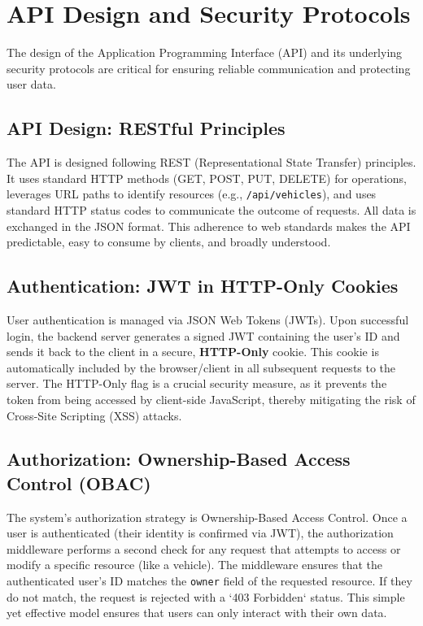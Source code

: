 \section{API Design and Security Protocols}

The design of the Application Programming Interface (API) and its underlying security protocols are critical for ensuring reliable communication and protecting user data.

\subsection{API Design: RESTful Principles}
The API is designed following REST (Representational State Transfer) principles. It uses standard HTTP methods (GET, POST, PUT, DELETE) for operations, leverages URL paths to identify resources (e.g., \texttt{/api/vehicles}), and uses standard HTTP status codes to communicate the outcome of requests. All data is exchanged in the JSON format. This adherence to web standards makes the API predictable, easy to consume by clients, and broadly understood.

\subsection{Authentication: JWT in HTTP-Only Cookies}
User authentication is managed via JSON Web Tokens (JWTs). Upon successful login, the backend server generates a signed JWT containing the user's ID and sends it back to the client in a secure, \textbf{HTTP-Only} cookie. This cookie is automatically included by the browser/client in all subsequent requests to the server. The HTTP-Only flag is a crucial security measure, as it prevents the token from being accessed by client-side JavaScript, thereby mitigating the risk of Cross-Site Scripting (XSS) attacks.

\subsection{Authorization: Ownership-Based Access Control (OBAC)}
The system's authorization strategy is Ownership-Based Access Control. Once a user is authenticated (their identity is confirmed via JWT), the authorization middleware performs a second check for any request that attempts to access or modify a specific resource (like a vehicle). The middleware ensures that the authenticated user's ID matches the \texttt{owner} field of the requested resource. If they do not match, the request is rejected with a `403 Forbidden` status. This simple yet effective model ensures that users can only interact with their own data.

